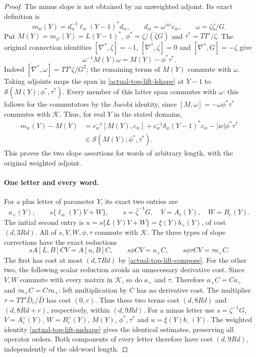 \begin{proof}
The minus slope is not obtained by an unweighted adjoint.
Its exact definition is
\[
 m_w(Y)=d_w^{-1}\ell_w(Y-1)^*d_w,\qquad
 d_w=\omega^{|w|}c_w,\qquad \omega=\zeta\bar\zeta/G.
\]
Put $M(Y)=m_\varnothing(Y)=L(Y-1)^*$,
$\phi^*=\zeta/(\bar\zeta G)$ and $\tau^*=TT'/\zeta$.
The original connection identities
$[\nabla^*,\bar\zeta]=-1$, $[\nabla^*,\zeta]=0$ and
$[\nabla^*,G]=-\zeta$ give
\[
 \omega^{-1}M(Y)\omega=M(Y)-\phi^*\tau^*.
\]
Indeed $[\nabla^*,\omega]=TT'\zeta/G^2$; the remaining
terms of $M(Y)$ commute with $\omega$.
Taking adjoints maps the span in
\eqref{actual-top-lift-lshape} at $Y-1$ to
$\mathscr S(M(Y);\phi^*,\tau^*)$.
Every member of this latter span commutes with $\omega$:
this follows for the commutators by the Jacobi identity,
since $[M,\omega]=-\omega\phi^*\tau^*$ commutes with
$\mathcal K$.  Thus, for real $Y$ in the stated domains,
\begin{align}
 m_w(Y)-M(Y)
  &=c_w^{-1}[M(Y),c_w]
     +c_w^{-1}\delta_w(Y-1)^*c_w-|w|\phi^*\tau^*\nonumber\\
  &\in\mathscr S(M(Y);\phi^*,\tau^*).
                                                    \label{actual-top-lift-mshape}
\end{align}
This proves the two slope assertions for words of arbitrary
length, with the original weighted adjoint.\cite{top-lift-shape-source}

\paragraph{One letter and every word.}
For a plus letter of parameter $Y$, its exact two entries are
\[
 a_+(Y),\qquad s\{\ell_w(Y)V+W\},\qquad
 s=\bar\zeta^{-1}G,\quad V=A_r(Y),\quad W=B_r(Y).
\]
The initial second entry is
$u=s\{L(Y)V+W\}=\xi(Y)b_+(Y)$, of cost $(d,3Rd)$.
All of $s,V,W,\phi,\tau$ commute with $\mathcal K$.
The three types of slope corrections have the exact reductions
\[
 sA[L,B]CV=A[u,B]C,\qquad s\phi CV=a_+C,\qquad
                      s\phi\tau CV=\tau a_+C.
\]
The first has cost at most $(d,7Rd)$ by
\eqref{actual-top-lift-compose}.  For the other two, the
following scalar reduction avoids an unnecessary derivative
cost.  Since $V,W$
commute with every matrix in $\mathcal K$, so do $a_+$
and $\tau$.  Therefore $a_+C=Ca_+$ and
$\tau a_+C=C\tau a_+$: left multiplication by $C$
has no derivative cost.  The multiplier
$\tau=TT'\bar D_r/\bar D$ has cost $(0,r)$.
Thus these two terms cost $(d,8Rd)$ and $(d,8Rd+r)$,
respectively, within $(d,9Rd)$.
For a minus letter use
$s=\zeta^{-1}G$, $V=A_r^\vee(Y)$, $W=B_r^\vee(Y)$,
$M(Y)$, $\phi^*,\tau^*$ and $u=\xi(Y)b_-(Y)$.
The weighted identity \eqref{actual-top-lift-mshape}
gives the identical estimates, preserving all operator orders.
Both components of every letter therefore have cost $(d,9Rd)$,
independently of the old-word length.


\end{proof}
